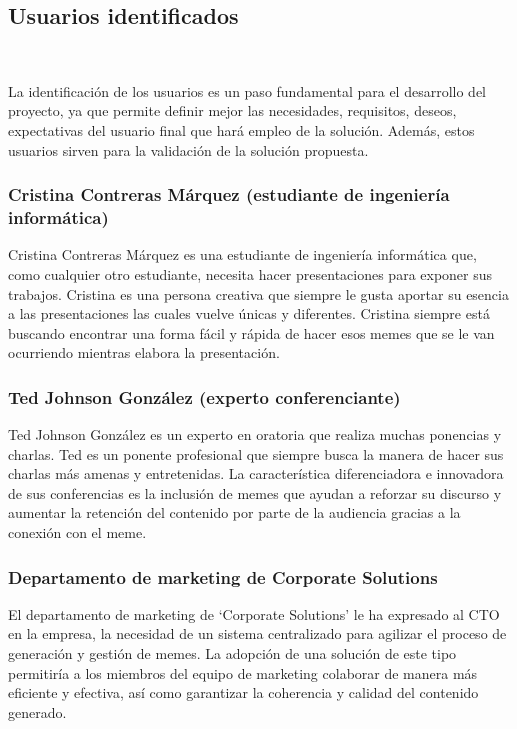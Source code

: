 \subsection{Usuarios identificados}~\label{sec:usuarios_identificados}

    La identificación de los usuarios es un paso fundamental para el desarrollo del proyecto, ya que permite definir mejor las necesidades, requisitos, deseos, expectativas del usuario final que hará empleo de la solución. Además, estos usuarios sirven para la validación de la solución propuesta.

    \subsubsection{Cristina Contreras Márquez (estudiante de ingeniería informática)}

    Cristina Contreras Márquez es una estudiante de ingeniería informática que, como cualquier otro estudiante, necesita hacer presentaciones para exponer sus trabajos. Cristina es una persona creativa que siempre le gusta aportar su esencia a las presentaciones las cuales vuelve únicas y diferentes. Cristina siempre está buscando encontrar una forma fácil y rápida de hacer esos memes que se le van ocurriendo mientras elabora la presentación.

    \subsubsection{Ted Johnson González (experto conferenciante)}

    Ted Johnson González es un experto en oratoria que realiza muchas ponencias y charlas. Ted es un ponente profesional que siempre busca la manera de hacer sus charlas más amenas y entretenidas. La característica diferenciadora e innovadora de sus conferencias es la inclusión de memes que ayudan a reforzar su discurso y aumentar la retención del contenido por parte de la audiencia gracias a la conexión con el meme.

    \subsubsection{Departamento de marketing de Corporate Solutions}

    El departamento de marketing de ‘Corporate Solutions’ le ha expresado al CTO en la empresa, la necesidad de un sistema centralizado para agilizar el proceso de generación y gestión de memes. La adopción de una solución de este tipo permitiría a los miembros del equipo de marketing colaborar de manera más eficiente y efectiva, así como garantizar la coherencia y calidad del contenido generado. 

